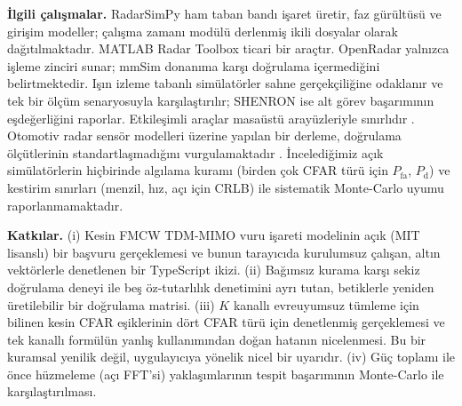 \documentclass[conference,a4paper,10pt]{IEEEtran}
\newcommand{\Pfa}{P_{\mathrm{fa}}}
\newcommand{\Pd}{P_{\mathrm{d}}}
\begin{document}
\textbf{İlgili çalışmalar.} RadarSimPy \cite{radarsimpy} ham taban bandı işaret üretir, faz gürültüsü ve girişim modeller; çalışma zamanı modülü derlenmiş ikili dosyalar olarak dağıtılmaktadır. MATLAB Radar Toolbox \cite{mathworks_radar} ticari bir araçtır. OpenRadar \cite{gupta2019openradar} yalnızca işleme zinciri sunar; mmSim \cite{cui2023mmsim} donanıma karşı doğrulama içermediğini belirtmektedir. Işın izleme tabanlı simülatörler \cite{schussler2021realistic} sahne gerçekçiliğine odaklanır ve tek bir ölçüm senaryosuyla karşılaştırılır; SHENRON \cite{bansal2023shenron} ise alt görev başarımının eşdeğerliğini raporlar. Etkileşimli araçlar masaüstü arayüzleriyle sınırlıdır \cite{fahnemann2022sarsim}. Otomotiv radar sensör modelleri üzerine yapılan bir derleme, doğrulama ölçütlerinin standartlaşmadığını vurgulamaktadır \cite{magosi2022survey}. İncelediğimiz açık simülatörlerin hiçbirinde algılama kuramı (birden çok CFAR türü için $\Pfa$, $\Pd$) ve kestirim sınırları (menzil, hız, açı için CRLB) ile sistematik Monte-Carlo uyumu raporlanmamaktadır.

\textbf{Katkılar.} (i) Kesin FMCW TDM-MIMO vuru işareti modelinin açık (MIT lisanslı) bir başvuru gerçeklemesi ve bunun tarayıcıda kurulumsuz çalışan, altın vektörlerle denetlenen bir TypeScript ikizi. (ii) Bağımsız kurama karşı sekiz doğrulama deneyi ile beş öz-tutarlılık denetimini ayrı tutan, betiklerle yeniden üretilebilir bir doğrulama matrisi. (iii) $K$ kanallı evreuyumsuz tümleme için bilinen kesin CFAR eşiklerinin \cite{shor1991performances,ritcey1990detection} dört CFAR türü için denetlenmiş gerçeklemesi ve tek kanallı formülün yanlış kullanımından doğan hatanın nicelenmesi. Bu bir kuramsal yenilik değil, uygulayıcıya yönelik nicel bir uyarıdır. (iv) Güç toplamı ile önce hüzmeleme (açı FFT'si) yaklaşımlarının tespit başarımının Monte-Carlo ile karşılaştırılması.

\end{document}
